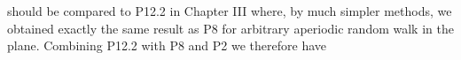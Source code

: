 should be compared to P12.2 in Chapter III where, by much simpler methods, we obtained exactly the same result as P8 for arbitrary aperiodic random walk in the plane. Combining P12.2 with P8 and P2 we therefore have